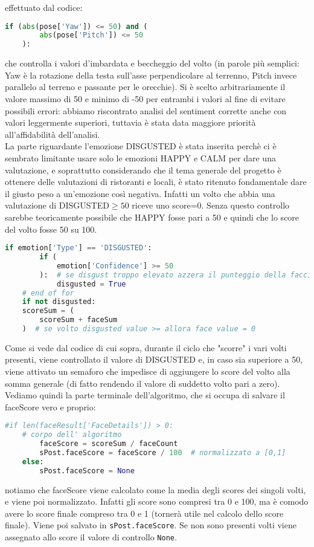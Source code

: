 effettuato dal codice:
\begin{lstlisting}[language=Python]
    if (abs(pose['Yaw']) <= 50) and (
        abs(pose['Pitch']) <= 50
    ):
\end{lstlisting}
che controlla i valori d'imbardata e beccheggio del volto (in parole più semplici: Yaw è 
la rotazione della testa sull'asse perpendicolare al terrenno, Pitch invece parallelo al 
terreno e passante per le orecchie). Si è scelto arbitrariamente il valore massimo di 50 e minimo 
di -50 per entrambi i valori al fine di evitare possibili errori: abbiamo riscontrato analisi del 
sentiment corrette anche con valori leggermente superiori, tuttavia è stata data maggiore priorità
all'affidabilità dell'analisi. \\
La parte riguardante l'emozione DISGUSTED è stata inserita perchè ci è sembrato limitante usare
solo le emozioni HAPPY e CALM per dare una valutazione, e soprattutto considerando che il tema
generale del progetto è ottenere delle valutazioni di ristoranti e locali, è stato ritenuto
fondamentale dare il giusto peso a un'emozione così negativa. Infatti un volto che abbia una
valutazione di DISGUSTED$\geq50$ riceve uno score=0. Senza questo controllo sarebbe teoricamente
possibile che HAPPY fosse pari a 50 e quindi che lo score del volto fosse 50 su 100.
\begin{lstlisting}[language=Python]
        if emotion['Type'] == 'DISGUSTED':
        if (
            emotion['Confidence'] >= 50
        ):  # se disgust troppo elevato azzera il punteggio della faccia
            disgusted = True
    # end of for
    if not disgusted:
    scoreSum = (
        scoreSum + faceSum
    )  # se volto disgusted value >= allora face value = 0
\end{lstlisting}
Come si vede dal codice di cui sopra, durante il ciclo che "scorre" i vari volti presenti, viene
controllato il valore di DISGUSTED e, in caso sia superiore a 50, viene attivato un semaforo 
che impedisce di aggiungere lo score del volto alla somma generale (di fatto rendendo il valore
di suddetto volto pari a zero).
Vediamo quindi la parte terminale dell'algoritmo, che si occupa di salvare il faceScore vero e proprio:
\begin{lstlisting}[language=Python]
    #if len(faceResult['FaceDetails']) > 0: 
    # corpo dell' algoritmo 
        faceScore = scoreSum / faceCount 
        sPost.faceScore = faceScore / 100  # normalizzato a [0,1]
    else:
        sPost.faceScore = None
\end{lstlisting}
notiamo che faceScore viene calcolato come la media degli scores dei singoli volti, e viene poi
normalizzato. Infatti gli score sono compresi tra 0 e 100, ma è comodo avere lo score finale compreso
tra 0 e 1 (tornerà utile nel calcolo dello score finale). 
Viene poi salvato in \verb+sPost.faceScore+. 
Se non sono presenti volti viene assegnato allo score il valore di controllo \verb+None+.
